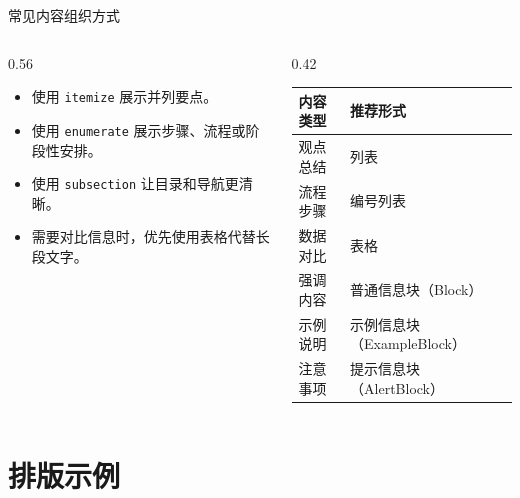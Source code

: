 \documentclass[aspectratio=169,11pt]{ctexbeamer}
\begin{document}
\begin{frame}{常见内容组织方式}
    \begin{columns}[T]
        \begin{column}{0.56\linewidth}
            \begin{itemize}[<+-| alert@+>]
                \item 使用 \texttt{itemize} 展示并列要点。
                \item 使用 \texttt{enumerate} 展示步骤、流程或阶段性安排。
                \item 使用 \texttt{subsection} 让目录和导航更清晰。
                \item 需要对比信息时，优先使用表格代替长段文字。
            \end{itemize}
        \end{column}
        \begin{column}{0.42\linewidth}
            \begin{table}
                \centering
                \scriptsize
                \begin{tabular}{ll}
                    \toprule
                    内容类型 & 推荐形式 \\
                    \midrule
                    观点总结 & 列表 \\
                    流程步骤 & 编号列表 \\
                    数据对比 & 表格 \\
                    强调内容 & 普通信息块（Block） \\
                    示例说明 & 示例信息块（ExampleBlock） \\
                    注意事项 & 提示信息块（AlertBlock） \\
                    \bottomrule
                \end{tabular}
            \end{table}
        \end{column}
    \end{columns}
\end{frame}

\section{排版示例}
\end{document}
